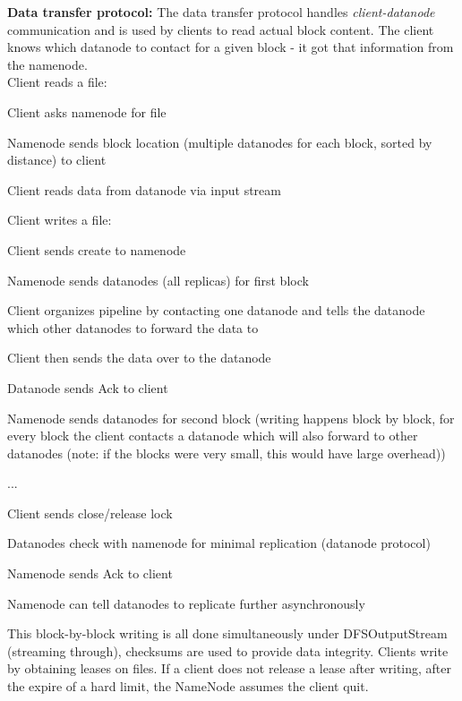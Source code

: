 \documentclass[11pt,oneside,a4paper]{article}
\begin{document}
\textbf{Data transfer protocol:} The data transfer protocol handles \textit{client-datanode} communication and is used by clients to read actual block content. The client knows which datanode to contact for a given block - it got that information from the namenode.\\
Client reads a file:

\begin{compactenum}
	\item Client asks namenode for file
	\item Namenode sends block location (multiple datanodes for each block, sorted by distance) to client
	\item Client reads data from datanode via input stream\\
\end{compactenum}

Client writes a file:

\begin{compactenum}
	\item Client sends create to namenode
	\item Namenode sends datanodes (all replicas) for first block
	\item Client organizes pipeline by contacting one datanode and tells the datanode which other datanodes to forward the data to
	\item Client then sends the data over to the datanode
	\item Datanode sends Ack to client
	\item Namenode sends datanodes for second block (writing happens block by block, for every block the client contacts a datanode which will also forward to other datanodes (note: if the blocks were very small, this would have large overhead))
	\item ...
	\item Client sends close/release lock
	\item Datanodes check with namenode for minimal replication (datanode protocol)
	\item Namenode sends Ack to client
	\item Namenode can tell datanodes to replicate further asynchronously
\end{compactenum}

This block-by-block writing is all done simultaneously under DFSOutputStream (streaming through), checksums are used to provide data integrity. Clients write by obtaining leases on files. If a client does not release a lease after writing, after the expire of a hard limit, the NameNode assumes the client quit.
\end{document}
